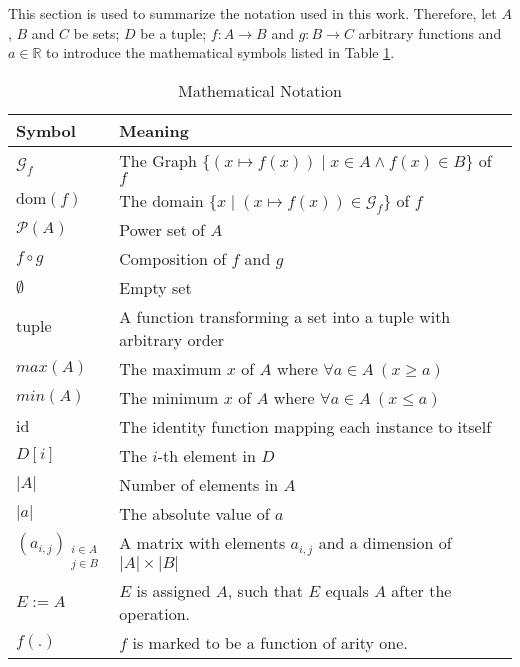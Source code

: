 This section is used to summarize the notation used in this work. Therefore, let $A$, $B$ and $C$ be sets; $D$ be a tuple; $f:A \to B$ and $g:B \to C$ arbitrary functions and $a \in \mathbb{R}$ to introduce the mathematical symbols listed in Table \ref{tab:mathematical_symbols}. 
    
    \begin{table} [h]
        \centering
        \begin{tabular}{l|l}
             \toprule
             Symbol & Meaning \\
             \midrule
             \midrule
             $\mathcal{G}_f$ & The Graph $\{(x \mapsto f(x)) \mid x \in A \land f(x) \in B\}$ of $f$\\
             $\text{dom}(f)$ & The domain $\{x \mid (x \mapsto f(x)) \in \mathcal{G}_f\}$ of $f$\\
             $\mathcal{P}(A)$ & Power set of $A$\\ 
             $f \circ g$ & Composition of $f$ and $g$ \\
             $\emptyset$ & Empty set \\
             $\text{tuple}$ & A function transforming a set into a tuple with arbitrary order \\
             $max(A)$ & The maximum $x$ of $A$ where $\forall a \in A ~ (x \geq a)$  \\
             $min(A)$ & The minimum $x$ of $A$ where $\forall a \in A ~ (x \leq a)$  \\
             $\text{id}$ & The identity function mapping each instance to itself \\
             $D[i]$ & The $i$-th element in $D$ \\
             $|A|$ & Number of elements in $A$ \\
             $|a|$ & The absolute value of $a$ \\
             $(a_{i,j})_{\substack{i \in A\\j \in B}}$ & A matrix with elements $a_{i,j}$ and a dimension of $|A| \times |B|$ \\ 
             $E := A$ & $E$ is assigned $A$, such that $E$ equals $A$ after the operation.\\
             $f(.)$ & $f$ is marked to be a function of  arity one.\\
             \bottomrule
        \end{tabular}        
        \caption{Mathematical Notation}
        \label{tab:mathematical_symbols}
    \end{table}

